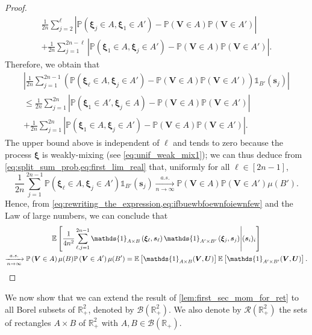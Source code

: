 \documentclass[11pt,a4paper,oneside]{article}
\theoremstyle{definition}
\theoremstyle{remark}
\def\E{\mathbb{E}}
\def\P{\mathbb{P}}
\def\R{\mathbb{R}}
\begin{document}
\begin{proof}
\begin{multline}
\frac{1}{2n}\sum_{j=2}^{\ell} \left|\P\left(\bm \xi_j\in A,\bm \xi_1\in A'\right)-\P\left(\bm V\in A\right)\P\left(\bm V \in A'\right)\right|\\
+\frac{1}{2n}\sum_{j=1}^{2n-\ell} \left|\P\left(\bm \xi_1\in A,\bm \xi_j\in A'\right)-\P\left(\bm V\in A\right)\P\left(\bm V \in A'\right)\right|.
\end{multline}
Therefore, we obtain that
\begin{multline}
\left|\frac{1}{2n}\sum_{j=1}^{2n-1} \left(\P\left(\bm \xi_\ell\in A,\bm \xi_j\in A'\right)-\P\left(\bm V \in A\right)\P\left(\bm V \in A'\right)\right)\mathds{1}_{B'}(\bm s_j)\right|\\
\leq
\frac{1}{2n}\sum_{j=1}^{2n} \left|\P\left(\bm \xi_1\in A',\bm \xi_j\in A\right)-\P\left(\bm V\in A\right)\P\left(\bm V \in A'\right)\right|\\
+\frac{1}{2n}\sum_{j=1}^{2n} \left|\P\left(\bm \xi_1\in A,\bm \xi_j\in A'\right)-\P\left(\bm V\in A\right)\P\left(\bm V \in A'\right)\right|.
\end{multline}
The upper bound above is independent of $\ell$ and tends to zero because the process $\bm \xi$ is weakly-mixing (see \cref{eq:unif_weak_mix1}); we can thus deduce from \cref{eq:split_sum_prob,eq:first_lim_real} that, uniformly for all $\ell\in[2n-1]$,
\begin{equation}\label{eq:ifbuewbfoewnfoiewnfew}
\frac{1}{2n}\sum_{j=1}^{2n-1} \P\left(\bm \xi_\ell\in A,\bm \xi_j\in A'\right)\mathds{1}_{B'}(\bm s_j)
\xrightarrow[n\to\infty]{a.s.}
\P\left(\bm V\in A\right)\P\left(\bm V \in A'\right)\mu(B').
\end{equation}
Hence, from \cref{eq:rewriting_the_expression,eq:ifbuewbfoewnfoiewnfew} and the Law of large numbers, we can conclude that
\begin{multline}
\E\left[\frac{1}{4n^2}\sum_{\ell,j=1}^{2n-1} \mathds{1}_{A \times B}\left(\bm \xi_\ell,\bm s_\ell\right) \mathds{1}_{A' \times B'}\left(\bm \xi_j,\bm s_j\right)\middle| (\bm s_i)_i\right]\\
\xrightarrow[n\to\infty]{a.s.} \P\left(\bm V\in A\right)\mu(B)\P\left(\bm V \in A'\right)\mu(B')
=\E\left[\mathds{1}_{A \times B}(\bm V,\bm U)\right]\E\left[\mathds{1}_{A' \times B'}(\bm V,\bm U)\right].\qedhere
\end{multline}
\end{proof}


We now show that we can extend the result of \cref{lem:first_sec_mom_for_ret} to all Borel subsets of $\R_+^2$, denoted by  $\mathcal{B}(\R_+^2)$. 
We also denote by $\mathcal{R}(\R_+^2)$ the sets of rectangles $A\times B$ of $\R_+^2$ with $A,B\in\mathcal{B}(\R_+)$.
\end{document}
